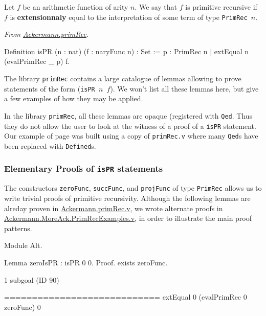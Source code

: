 Let $f$ be an arithmetic function of arity $n$. We say that $f$ is primitive recursive if $f$ is \textbf{extensionnaly}
equal to the interpretation of some term of type \texttt{PrimRec $n$}. 

\vspace{4pt}
\noindent
\emph{From \href{../theories/html/hydras.Ackermann.primRec.html}{Ackermann.primRec}.}
\begin{Coqsrc}
Definition isPR (n : nat) (f : naryFunc n) : Set :=
  {p : PrimRec n | extEqual n (evalPrimRec _ p) f}.  
\end{Coqsrc}

The library \texttt{primRec} contains a large catalogue of lemmas allowing to prove statements 
of the form (\texttt{isPR $n$ $f$}). We won't list all these lemmas here, but give a few examples of
how they may be applied.

\begin{remark}
In the library \texttt{primRec}, all these lemmas are opaque (registered with \texttt{Qed}. Thus they do not allow the user to look at the witness of a proof of a \texttt{isPR} statement. Our example of page\pageref{sect:bigfac} was built using a  copy of \texttt{primRec.v} where many \texttt{Qed}s have been replaced with
\texttt{Defined}s.
\end{remark}

\subsubsection{Elementary Proofs of \texttt{isPR} statements}

The constructors \texttt{zeroFunc}, \texttt{succFunc},  and \texttt{projFunc} of type
\texttt{PrimRec} allows us to write trivial proofs of primitive recursivity. 
Although  the following lemmas are alreday proven in 
\href{../theories/html/hydras.Ackermann.primRec.html}{Ackermann.primRec.v},
we wrote alternate proofs in 
\href{../theories/html/hydras.MoreAck.PrimRecExamples.html}%
{Ackermann.MoreAck.PrimRecExamples.v}, in order to illustrate the main proof patterns.

\begin{Coqsrc}
Module Alt.
  
Lemma zeroIsPR : isPR 0 0.
Proof.
  exists zeroFunc.
\end{Coqsrc}

\begin{Coqanswer}
1 subgoal (ID 90)
  
  ============================
  extEqual 0 (evalPrimRec 0 zeroFunc) 0
\end{Coqanswer}

